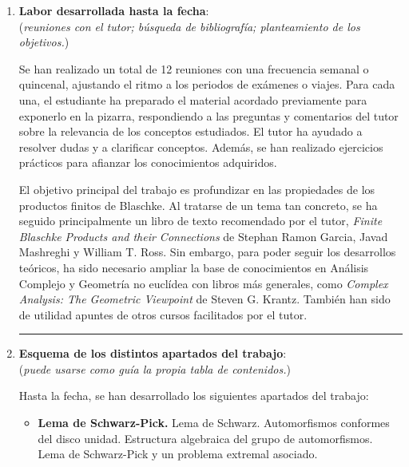\documentclass[a4paper,oneside,11pt,leqno]{article}
\begin{document}
\begin{enumerate}[label=\textbf{\arabic*.}]

\item {\bf Labor desarrollada hasta la fecha}: \\
{\small (\textit{reuniones con el tutor; b\'usqueda de bibliograf\'ia; planteamiento de los objetivos.})}

Se han realizado un total de 12 reuniones con una frecuencia semanal o quincenal, ajustando el ritmo a los periodos de ex\'amenes o viajes. Para cada una, el estudiante ha preparado el material acordado previamente para exponerlo en la pizarra, respondiendo a las preguntas y comentarios del tutor sobre la relevancia de los conceptos estudiados. El tutor ha ayudado a resolver dudas y a clarificar conceptos. Adem\'as, se han realizado ejercicios pr\'acticos para afianzar los conocimientos adquiridos.

El objetivo principal del trabajo es profundizar en las propiedades de los productos finitos de Blaschke. Al tratarse de un tema tan concreto, se ha seguido principalmente un libro de texto recomendado por el tutor, \cite{garciaFiniteBlaschkeProducts2018} \textit{Finite Blaschke Products and their Connections} de Stephan Ramon Garcia, Javad Mashreghi y William T. Ross. Sin embargo, para poder seguir los desarrollos te\'oricos, ha sido necesario ampliar la base de conocimientos en An\'alisis Complejo y Geometr\'ia no eucl\'idea con libros m\'as generales, como \cite{krantzComplexAnalysisGeometric2004} \textit{Complex Analysis: The Geometric Viewpoint} de Steven G. Krantz. Tambi\'en han sido de utilidad apuntes de otros cursos facilitados por el tutor.

\vskip 20pt 
\hrule

\item {\bf Esquema de los distintos apartados del trabajo}: \\
{\small (\textit{puede usarse como gu\'ia la propia tabla de contenidos.})}

Hasta la fecha, se han desarrollado los siguientes apartados del trabajo:

\begin{itemize}
    \item \textbf{Lema de Schwarz-Pick.} Lema de Schwarz. Automorfismos conformes del disco unidad. Estructura algebraica del grupo de automorfismos. Lema de Schwarz-Pick y un problema extremal asociado.
    

\end{itemize}
\end{enumerate}
\end{document}
